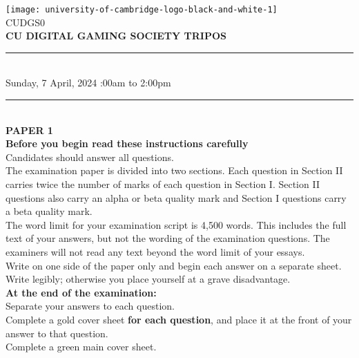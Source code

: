 \documentclass{article}
\begin{document}
\noindent \texttt{[image: university-of-cambridge-logo-black-and-white-1]}
\\ CUDGS0
\\ \textbf{CU DIGITAL GAMING SOCIETY TRIPOS }
\\ \hrule
\phantom{ } \vspace{5pt}\\
Sunday, 7 April, 2024 :00am to 2:00pm
\\ \hrule \phantom{ }\vspace{10pt}\\
\textbf{\large PAPER 1} \vspace{5pt} \\
\textbf{\large Before you begin read these instructions carefully}
\vspace{5pt}\\ 
Candidates should answer all questions.
\vspace{5pt}\\ 
The examination paper is divided into two sections. Each question in Section II
carries twice the number of marks of each question in Section I. Section II questions
also carry an alpha or beta quality mark and Section I questions carry a beta quality
mark.
\vspace{5pt}\\
The word limit for your examination script is 4,500 words. This includes the full text of your
answers, but not the wording of the examination questions. The examiners will not read any text
beyond the word limit of your essays.
\vspace{10pt}\\
Write on one side of the paper only and begin each answer on a separate sheet.\vspace{5pt}\\ 
Write legibly; otherwise you place yourself at a grave disadvantage.
\vspace{10pt}\\
\textbf{\large At the end of the examination:}
\vspace{5pt}\\ 
Separate your answers to each question.\vspace{5pt}\\
Complete a gold cover sheet \textbf{for each question}, and place
it at the front of your answer to that question.\vspace{5pt}\\
Complete a green main cover sheet.\vspace{5pt}\\
\end{document}
